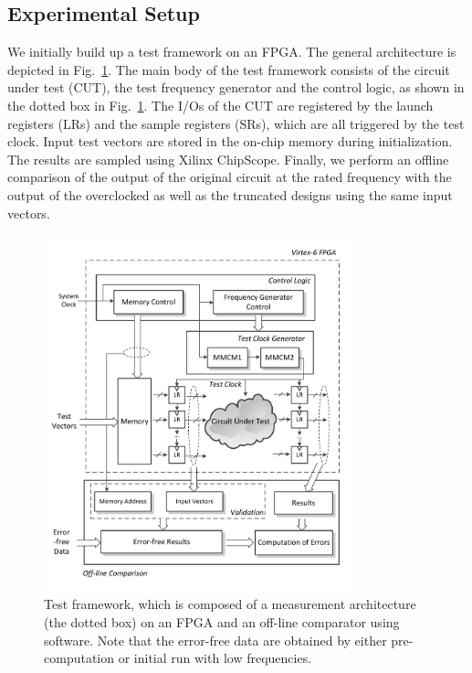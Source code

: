 \documentclass[prodmode,acmtrets]{acmsmall} %
\begin{document}
\subsection{Experimental Setup} \label{sub:experimental_setup}
We initially build up a test framework on an FPGA. The general architecture is depicted in Fig.~\ref{Test Framework}. The main body of the test framework consists of the circuit under test (CUT), the test frequency generator and the control logic, as shown in the dotted box in Fig.~\ref{Test Framework}. The I/Os of the CUT are registered by the launch registers (LRs) and the sample registers (SRs), which are all triggered by the test clock. Input test vectors are stored in the on-chip memory during initialization. The results are sampled using Xilinx ChipScope. Finally, we perform an offline comparison of the output of the original circuit at the rated frequency with the output of the overclocked as well as the truncated designs using the same input vectors.
%
\begin{figure}[htbp]
  \centering
  \vspace{-3ex}
  \includegraphics[width=3.5in]{./Figures/TestFramework.pdf}
  \caption{Test framework, which is composed of a measurement architecture (the dotted box) on an FPGA and an off-line comparator using software. Note that the error-free data are obtained by either pre-computation or initial run with low frequencies.}
  \label{Test Framework}
\end{figure}
\end{document}
